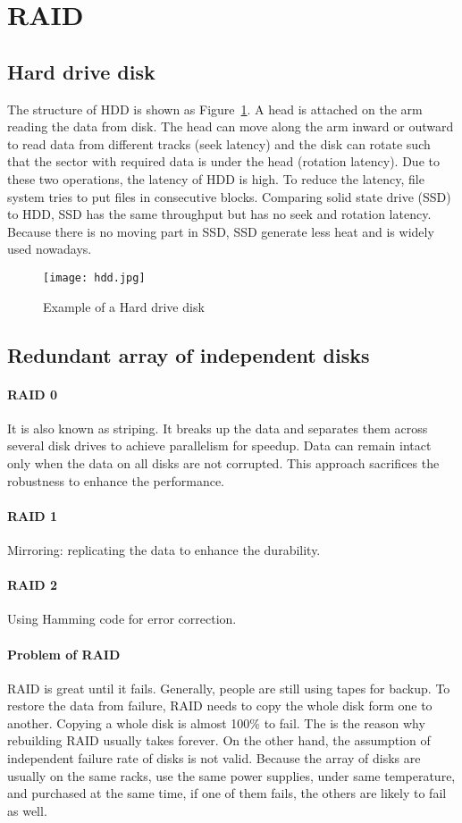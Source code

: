 \documentclass[twoside]{article}
\begin{document}
\section{RAID}
\subsection{Hard drive disk}
The structure of HDD is shown as Figure~\ref{f:hdd}. A head is attached on the arm reading the data from disk. The head can move along the arm inward or outward to read data from different tracks (seek latency) and the disk can rotate such that the sector with required data is under the head (rotation latency). Due to these two operations, the latency of HDD is high. To reduce the latency, file system tries to put files in consecutive blocks. Comparing solid state drive (SSD) to HDD, SSD has the same throughput but has no seek and rotation latency. Because there is no moving part in SSD, SSD generate less heat and is widely used nowadays.


\begin{figure}[h]
\centering
\texttt{[image: hdd.jpg]}
\caption{\label{f:hdd}Example of a Hard drive disk}
\end{figure}


\subsection{Redundant array of independent disks}

\paragraph{RAID 0} It is also known as striping. It breaks up the data and separates them across several disk drives to achieve parallelism for speedup. Data can remain intact only when the data on all disks are not corrupted. This approach sacrifices the robustness to enhance the performance.

\paragraph{RAID 1} Mirroring: replicating the data to enhance the durability.

\paragraph{RAID 2} Using Hamming code for error correction.

\paragraph{Problem of RAID} RAID is great until it fails. Generally, people are still using tapes for backup. To restore the data from failure, RAID needs to copy the whole disk form one to another. Copying a whole disk is almost 100\% to fail. The is the reason why rebuilding RAID usually takes forever. On the other hand, the assumption of independent failure rate of disks is not valid. Because the array of disks are usually on the same racks, use the same power supplies, under same temperature, and purchased at the same time, if one of them fails, the others are likely to fail as well.
\end{document}
